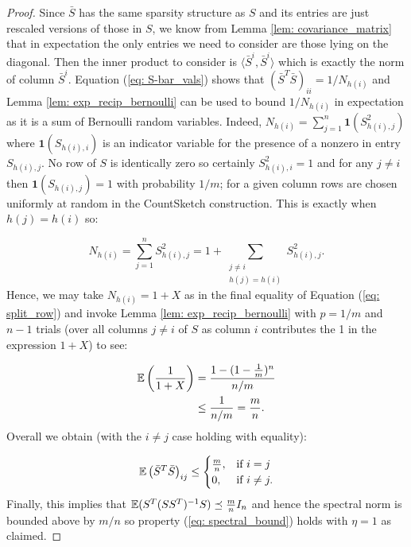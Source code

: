 \begin{proof}
  Since $\bar{S}$ has the same sparsity structure as $S$
  and its entries are just
  rescaled versions of those in $S$, we know from Lemma \ref{lem:
  covariance_matrix} that in expectation the only entries we need to consider
  are those lying on the diagonal.
  Then the inner product to consider is $\langle \bar{S}^i, \bar{S}^i \rangle$
  which  is exactly the norm of column $\bar{S}^i$.
  Equation (\ref{eq: S-bar_vals}) shows that $(\bar{S}^T \bar{S})_{ii} = 1/
  N_{h(i)}$ and
  Lemma \ref{lem: exp_recip_bernoulli} can be used to bound $1/ N_{h(i)}$ in
  expectation
  as it is a sum of Bernoulli random variables.
  Indeed, $N_{h(i)} = \sum_{j=1}^n \mathbf{1}(S_{h(i),j}^2)$ where $\mathbf{1}
  (S_{h(i),i})$ is an indicator variable for the presence of a nonzero in entry
  $S_{h(i),j}$.
  No row of $S$ is identically zero so certainly $S_{h(i), i}^2 = 1$ and for
  any $j \ne i$ then $\mathbf{1}(S_{h(i),j}) = 1$ with probability $1/m$; for a
  given column rows are chosen uniformly at random in the CountSketch
  construction.
  This is exactly when $h(j) = h(i)$ so:

  \begin{equation} \label{eq: split_row}
    N_{h(i)} = \sum_{j=1}^n S_{h(i), j}^2 = 1 + \sum_{\substack{ j \ne
     i \\ h(j) = h(i)}} S_{h(i), j}^2.
  \end{equation}
  Hence, we may take $N_{h(i)} = 1+X$ as in the final equality of
  Equation (\ref{eq: split_row}) and
  invoke Lemma \ref{lem: exp_recip_bernoulli} with $p=1/m$ and $n-1$
  trials (over all columns $j \ne i$ of $S$ as column $i$ contributes the
  1 in the expression $1+X$) to see:

  \begin{align}
    \mathbb{E} \left( \frac{1}{1+X} \right) &= \frac{1 - (1-\frac{1}{m})^n}{n/m} \label{eq: expectation}\\
                                &\le \frac{1}{n/m} = \frac{m}{n} \label{eq: final-expectation}.
  \end{align}
Overall we obtain (with the $i \ne j$ case holding with equality):

  \begin{equation}
    \mathbb{E} \left( \bar{S}^T \bar{S} \right)_{ij} \le
    \begin{cases}
      \frac{m}{n}, & \text{if}\ i=j \\
      0, & \text{if}\ i \ne j.
    \end{cases}
  \end{equation}
  Finally, this implies that $\mathbb{E} (S^T (SS^T)^{-1}S) \preceq \frac{m}{n} I_n$ and
  hence the spectral norm is bounded above by $m/n$ so property
  (\ref{eq: spectral_bound}) holds with $\eta = 1$ as claimed.

\end{proof}

